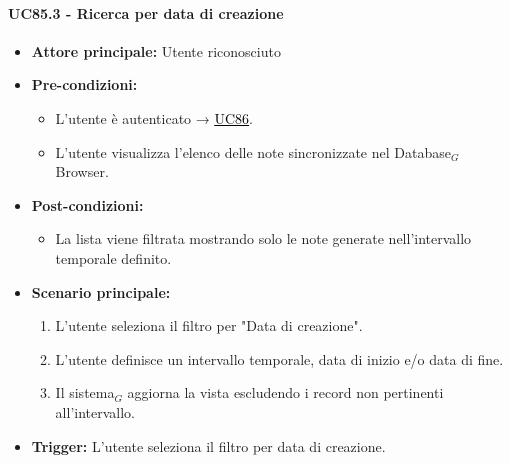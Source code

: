 \documentclass[a4paper, 10pt]{article}
\newcommand{\uclink}[2]{\hyperlink{#1}{\textcolor{black}{\underline{#2}}}}
\begin{document}
\paragraph{UC85.3 - Ricerca per data di creazione}
\hypertarget{uc:85.3}{}
\begin{itemize}
    \item \textbf{Attore principale:} Utente riconosciuto
    \item \textbf{Pre-condizioni:} 
        \begin{itemize}
            \item L'utente è autenticato → \uclink{uc:86}{UC86}.
            \item L'utente visualizza l'elenco delle note sincronizzate nel Database$_G$ Browser.
        \end{itemize}
    \item \textbf{Post-condizioni:} 
        \begin{itemize}
            \item La lista viene filtrata mostrando solo le note generate nell'intervallo temporale definito.
        \end{itemize}
    \item \textbf{Scenario principale:}
        \begin{enumerate}
            \item L'utente seleziona il filtro per "Data di creazione".
            \item L'utente definisce un intervallo temporale, data di inizio e/o data di fine.
            \item Il sistema$_G$ aggiorna la vista escludendo i record non pertinenti all'intervallo.
        \end{enumerate}
    \item \textbf{Trigger:} L'utente seleziona il filtro per data di creazione.
\end{itemize}
\end{document}
